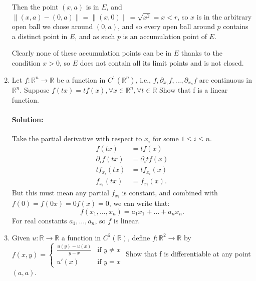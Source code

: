 \documentclass{article}
\begin{document}
\begin{enumerate}
    Then the point $(x,a)$ is in $E$, and $\|(x,a)-(0,a)\|=\|(x,0)\|=\sqrt{x^2} =x<r$, so $x$ is in the arbitrary open ball we chose around $(0,a)$, and so every open ball around $p$ contains a distinct point in $E$, and as such $p$ is an accumulation point of $E$.

    Clearly none of these accumulation points can be in $E$ thanks to the condition $x>0$, so $E$ does not contain all its limit points and is not closed.

\item Let $f : \mathbb{R}^n \to \mathbb{R}$ be a function in $C^1(\mathbb{R}^n)$, i.e., $f, \partial_{x_1} f, ..., \partial_{x_n} f$ are continuous in $\mathbb{R}^n$. Suppose  $f(tx) = t f(x), \forall x \in \mathbb{R}^n, \forall t \in \mathbb{R}$  Show that f is a linear function.  
    \paragraph{Solution: }Take the partial derivative with respect to $x_{i}$ for some $1\leq i\leq n$.
    \begin{align*}
        f(tx)&= tf(x) \\
        \partial_if(tx)&=\partial_i tf(x) \\
        tf_{x_i}(tx)&= tf_{x_{i}}(x) \\
        f_{x_i}(tx)&= f_{x_{i}}(x)
    .\end{align*}
    But this must mean any partial $f_{x_{i}}$ is constant, and combined with $f(0)=f(0x)=0f(x)=0$, we can write that:
    \[
    f(x_1,\dots,x_n)=a_1x_1+\dots+a_nx_n
    .\] For real constants $a_1,\dots,a_n$, so $f$ is linear.

\newpage

\item Given $u : \mathbb{R} \to \mathbb{R}$ a function in $C^2(\mathbb{R})$, define $f : \mathbb{R}^2 \to \mathbb{R}$ by  $f(x,y) = \begin{cases} \frac{u(y) - u(x)}{y-x} & \text{if } y \neq x \\ u'(x) & \text{if } y = x \end{cases}$  Show that f is differentiable at any point $(a,a)$.  

\end{enumerate}
\end{document}
